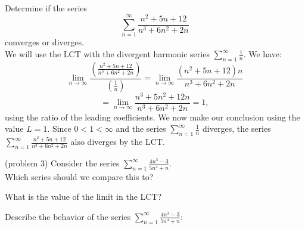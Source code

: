 \documentclass[handout]{ximera}
\begin{document}
\begin{example}[example 3]
Determine if the series 
\[
\sum_{n=1}^\infty \frac{n^2 + 5n + 12}{n^3 + 6n^2 + 2n}
\]
converges or diverges.\\
We will use the LCT with the divergent harmonic series $\displaystyle{\sum_{n=1}^\infty \frac{1}{n}}$. We have:
\[
\lim_{n \to \infty} \frac{\left(\frac{n^2 + 5n + 12}{n^3 + 6n^2 + 2n}\right)}{\left(\frac{1}{n}\right)} = \lim_{n \to \infty} \frac{(n^2 + 5n + 12)n}{n^3 + 6n^2 + 2n}
\]
\[
= \lim_{n \to \infty} \frac{n^3 + 5n^2 + 12n}{n^3 + 6n^2 + 2n} = 1,
\]
using the ratio of the leading coefficients. We now make our conclusion using the value $L = 1$. Since $0 < 1 < \infty$ and the series $\displaystyle{\sum_{n=1}^\infty \frac{1}{n}}$
diverges, the series $\displaystyle{\sum_{n=1}^\infty \frac{n^2 + 5n + 12}{n^3 + 6n^2 + 2n}}$ also diverges by the LCT.
\end{example}




\begin{problem}(problem 3)
Consider the series $\displaystyle{\sum_{n=1}^\infty \frac{4n^3 -3}{5n^4 + n}}$.\\
Which series should we compare this to?

\begin{multipleChoice}
\end{multipleChoice}

What is the value of the limit in the LCT?
\begin{multipleChoice}
\end{multipleChoice}

Describe the behavior of the series $\displaystyle{\sum_{n=1}^\infty \frac{4n^3 -3}{5n^4 +n}:}$
\begin{multipleChoice}
\end{multipleChoice}

\end{problem}
\end{document}
